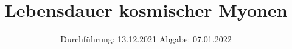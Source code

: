 
\setlength\parindent{0pt}
\subject{V01}
\title{Lebensdauer kosmischer Myonen}
\date{%
  Durchführung: 13.12.2021
  \hspace{3em}
  Abgabe: 07.01.2022 \\
}


\maketitle
\thispagestyle{empty}
\tableofcontents
\newpage
{}







\newpage
\nocite{*}
\printbibliography
\appendix


